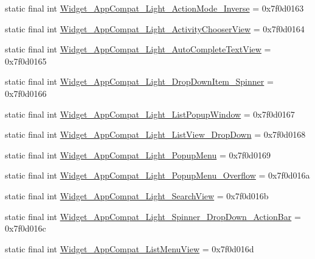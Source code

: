 \begin{DoxyCompactItemize}
static final int \mbox{\hyperlink{classandroid_1_1support_1_1design_1_1R_1_1style_a6e1722fbff8cb1145ad90f0ee788cf4e}{Widget\+\_\+\+App\+Compat\+\_\+\+Light\+\_\+\+Action\+Mode\+\_\+\+Inverse}} = 0x7f0d0163
\item 
static final int \mbox{\hyperlink{classandroid_1_1support_1_1design_1_1R_1_1style_af07a14791a23f65ae9b307e705db296d}{Widget\+\_\+\+App\+Compat\+\_\+\+Light\+\_\+\+Activity\+Chooser\+View}} = 0x7f0d0164
\item 
static final int \mbox{\hyperlink{classandroid_1_1support_1_1design_1_1R_1_1style_ac380b3f53f40de9211056c64b6f66307}{Widget\+\_\+\+App\+Compat\+\_\+\+Light\+\_\+\+Auto\+Complete\+Text\+View}} = 0x7f0d0165
\item 
static final int \mbox{\hyperlink{classandroid_1_1support_1_1design_1_1R_1_1style_a118bf1b8561a3ae251ed642e8fb9bbeb}{Widget\+\_\+\+App\+Compat\+\_\+\+Light\+\_\+\+Drop\+Down\+Item\+\_\+\+Spinner}} = 0x7f0d0166
\item 
static final int \mbox{\hyperlink{classandroid_1_1support_1_1design_1_1R_1_1style_a2822c3939a9985a663bd4bbfb42a5b10}{Widget\+\_\+\+App\+Compat\+\_\+\+Light\+\_\+\+List\+Popup\+Window}} = 0x7f0d0167
\item 
static final int \mbox{\hyperlink{classandroid_1_1support_1_1design_1_1R_1_1style_a94e847b19fdbecbf77bcf9270efd3c07}{Widget\+\_\+\+App\+Compat\+\_\+\+Light\+\_\+\+List\+View\+\_\+\+Drop\+Down}} = 0x7f0d0168
\item 
static final int \mbox{\hyperlink{classandroid_1_1support_1_1design_1_1R_1_1style_a6de5f5410fa15acb332677f38900251c}{Widget\+\_\+\+App\+Compat\+\_\+\+Light\+\_\+\+Popup\+Menu}} = 0x7f0d0169
\item 
static final int \mbox{\hyperlink{classandroid_1_1support_1_1design_1_1R_1_1style_ab4760c992c625181f7217741a86bd3f1}{Widget\+\_\+\+App\+Compat\+\_\+\+Light\+\_\+\+Popup\+Menu\+\_\+\+Overflow}} = 0x7f0d016a
\item 
static final int \mbox{\hyperlink{classandroid_1_1support_1_1design_1_1R_1_1style_a58e29240634e52dc3816876687bd0209}{Widget\+\_\+\+App\+Compat\+\_\+\+Light\+\_\+\+Search\+View}} = 0x7f0d016b
\item 
static final int \mbox{\hyperlink{classandroid_1_1support_1_1design_1_1R_1_1style_a7a4fe1246deb189632a33f6311618b8e}{Widget\+\_\+\+App\+Compat\+\_\+\+Light\+\_\+\+Spinner\+\_\+\+Drop\+Down\+\_\+\+Action\+Bar}} = 0x7f0d016c
\item 
static final int \mbox{\hyperlink{classandroid_1_1support_1_1design_1_1R_1_1style_a60b1d73b99766ec4be47a24851e4c72c}{Widget\+\_\+\+App\+Compat\+\_\+\+List\+Menu\+View}} = 0x7f0d016d

\end{DoxyCompactItemize}
